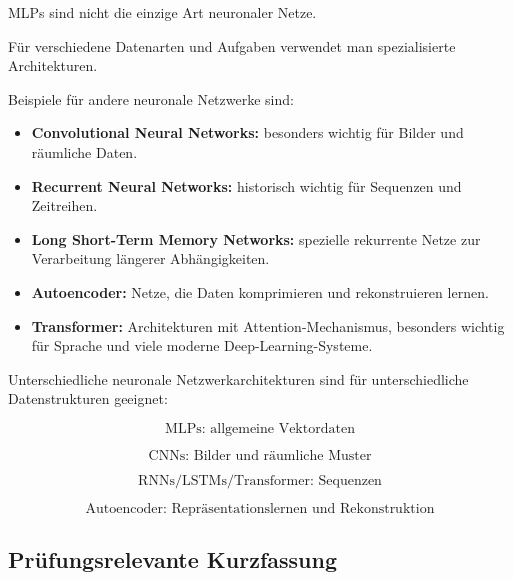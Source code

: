 \documentclass[11pt,a4paper]{scrartcl}
\begin{document}
\begin{notebox}
    MLPs sind nicht die einzige Art neuronaler Netze.

    Für verschiedene Datenarten und Aufgaben verwendet man spezialisierte
    Architekturen.
\end{notebox}

\begin{solutionbox}
    Beispiele für andere neuronale Netzwerke sind:

    \begin{itemize}
        \item \textbf{Convolutional Neural Networks:}
        besonders wichtig für Bilder und räumliche Daten.

        \item \textbf{Recurrent Neural Networks:}
        historisch wichtig für Sequenzen und Zeitreihen.

        \item \textbf{Long Short-Term Memory Networks:}
        spezielle rekurrente Netze zur Verarbeitung längerer Abhängigkeiten.

        \item \textbf{Autoencoder:}
        Netze, die Daten komprimieren und rekonstruieren lernen.

        \item \textbf{Transformer:}
        Architekturen mit Attention-Mechanismus, besonders wichtig für Sprache
        und viele moderne Deep-Learning-Systeme.
    \end{itemize}
\end{solutionbox}

\begin{answerbox}
    Unterschiedliche neuronale Netzwerkarchitekturen sind für unterschiedliche
    Datenstrukturen geeignet:

    \[
        \boxed{
            \text{MLPs: allgemeine Vektordaten}
        }
    \]

    \[
        \boxed{
            \text{CNNs: Bilder und räumliche Muster}
        }
    \]

    \[
        \boxed{
            \text{RNNs/LSTMs/Transformer: Sequenzen}
        }
    \]

    \[
        \boxed{
            \text{Autoencoder: Repräsentationslernen und Rekonstruktion}
        }
    \]
\end{answerbox}

\subsection{Prüfungsrelevante Kurzfassung}
\end{document}
